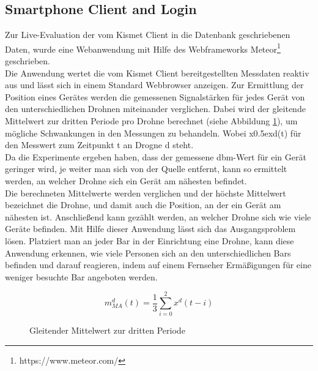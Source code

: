 \documentclass[a4paper]{spie}  %
\begin{document}
\subsection{Smartphone Client and Login}
Zur Live-Evaluation der vom Kismet Client in die Datenbank geschriebenen Daten, wurde eine Webanwendung mit Hilfe des Webframeworks Meteor\footnote{https://www.meteor.com/} geschrieben. \\
Die Anwendung wertet die vom Kismet Client bereitgestellten Messdaten reaktiv aus und lässt sich in einem Standard Webbrowser anzeigen. 
Zur Ermittlung der Position eines Gerätes werden die gemessenen Signalstärken für jedes Gerät von den unterschiedlichen Drohnen miteinander verglichen. Dabei wird der gleitende Mittelwert zur dritten Periode pro Drohne berechnet (siehe Abbildung \ref{eqn:middle}), um mögliche Schwankungen in den Messungen zu behandeln. Wobei x\raise0.5ex\hbox{d}(t) für den Messwert zum Zeitpunkt t an Drogne d steht.
\\Da die Experimente ergeben haben, dass der gemessene dbm-Wert für ein Gerät geringer wird, je weiter man sich von der Quelle entfernt, kann so ermittelt werden, an welcher Drohne sich ein Gerät am nähesten befindet. \\
Die berechneten Mittelwerte werden verglichen und der höchste Mittelwert bezeichnet die Drohne, und damit auch die Position, an der ein Gerät am nähesten ist. Anschließend kann gezählt werden, an welcher Drohne sich wie viele Geräte befinden. Mit Hilfe dieser Anwendung lässt sich das Ausgangsproblem lösen. Platziert man an jeder Bar in der Einrichtung eine Drohne, kann diese Anwendung erkennen, wie viele Personen sich an den unterschiedlichen Bars befinden und darauf reagieren, indem auf einem Fernseher Ermäßigungen für eine weniger besuchte Bar angeboten werden.
\begin{figure}
\begin{equation}
  \boxed{{ m }_{ MA }^{ d }(t) = \frac { 1 }{ 3 } \sum _{ i=0 }^{ 2 }{ { x }^{ d }(t-i) }}
\end{equation}
\caption{Gleitender Mittelwert zur dritten Periode}
\label{eqn:middle}
\end{figure}
\end{document}
